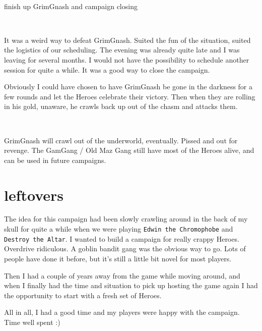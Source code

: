 \

\todo finish up GrimGnash and campaign closing

\

\begin{readoutloud}
It was a weird way to defeat GrimGnash. Suited the fun of the situation, suited the logistics of our scheduling. The evening was already quite late and I was leaving for several months. I would not have the possibility to schedule another session for quite a while. It was a good way to close the campaign.

Obviously I could have chosen to have GrimGnash be gone in the darkness for a few rounds and let the Heroes celebrate their victory. Then when they are rolling in his gold, unaware, he crawls back up out of the chasm and attacks them.

\

GrimGnash will crawl out of the underworld, eventually. Pissed and out for revenge. The GamGang / Old Maz Gang still have most of the Heroes alive, and can be used in future campaigns.
\end{readoutloud}































\clearpage
\raggedbottom
\section*{leftovers}

The idea for this campaign had been slowly crawling around in the back of my skull for quite a while when we were playing \texttt{Edwin the Chromophobe} and \texttt{Destroy the Altar}. I wanted to build a campaign for really crappy Heroes. Overdrive ridiculous. A goblin bandit gang was the obvious way to go. Lots of people have done it before, but it's still a little bit novel for most players.

Then I had a couple of years away from the game while moving around, and when I finally had the time and situation to pick up hosting the game again I had the opportunity to start with a fresh set of Heroes.

All in all, I had a good time and my players were happy with the campaign. Time well spent :)





